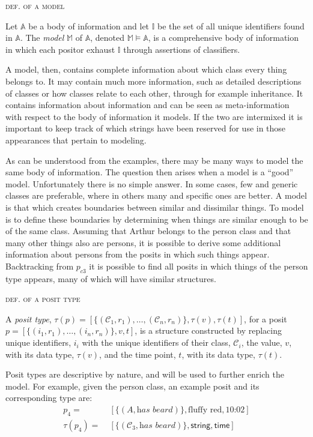 \documentclass[sfsidenotes,nobib,twoside,symmetric]{tufte-handout}
\newcommand{\typeof}[1]{\tau(#1)}
\newcounter{majorcount}
\newcommand{\deffy}[3]{
	\vspace{2ex}
	\refstepcounter{majorcount} 
	\noindent\textsc{#1}%
	\\\begin{small}
	\noindent #2%
	\label{Def:#3}
	\end{small}
	\vspace{2ex}
}
\begin{document}
\deffy{def. of a model}{%
Let $\mathbb{A}$ be a body of information and let $\mathbb{I}$ be the set of all unique identifiers found in $\mathbb{A}$. The \emph{model} $\mathbb{M}$ of $\mathbb{A}$, denoted $\mathbb{M} \models \mathbb{A}$, is a comprehensive body of information in which each positor exhaust $\mathbb{I}$ through assertions of classifiers.
}{model}

A model, then, contains complete information about which class every thing belongs to. It may contain much more information, such as detailed descriptions of classes or how classes relate to each other, through for example inheritance. It contains information about information and can be seen as meta-information with respect to the body of information it models. If the two are intermixed it is important to keep track of which strings have been reserved for use in those appearances that pertain to modeling.

As can be understood from the examples, there may be many ways to model the same body of information. The question then arises when a model is a \enquote{good} model. Unfortunately there is no simple answer. In some cases, few and generic classes are preferable, where in others many and specific ones are better. A model is that which creates boundaries between similar and dissimilar things. To model is to define these boundaries by determining when things are similar enough to be of the same class. Assuming that Arthur belongs to the person class and that many other things also are persons, it is possible to derive some additional information about persons from the posits in which such things appear. Backtracking from $p_{c3}$ it is possible to find all posits in which things of the person type appears, many of which will have similar structures.

\deffy{def. of a posit type}{%
A \emph{posit type}, $\typeof{p} = [\{(\mathcal{C}_1, r_1), \ldots, (\mathcal{C}_n, r_n)\}, \typeof{v}, \typeof{t}]$, for a posit $p = [\{(i_1, r_1), \ldots, (i_n, r_n)\}, v, t]$, is a structure constructed by replacing unique identifiers, $i_i$ with the unique identifiers of their class, $\mathcal{C}_i$, the value, $v$, with its data type, $\typeof{v}$, and the time point, $t$, with its data type, $\typeof{t}$.
}{posittype}

Posit types are descriptive by nature, and will be used to further enrich the model. For example, given the person class, an example posit and its corresponding type are:
\begin{align*}
p_{4} =\;& [\{(A, \textit{has beard})\}, \textrm{fluffy red}, \textrm{10:02}] \\
\typeof{p_{4}} =\;& [\{(\mathcal{C}_3, \textit{has beard})\}, \mathsf{string}, \mathsf{time}] 
\end{align*}
\end{document}

